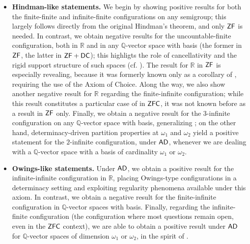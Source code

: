 \documentclass{amsart}
\theoremstyle{definition}
\newcommand{\zf}{\mathnormal{\mathsf{ZF}}}
\newcommand{\dc}{\mathnormal{\mathsf{DC}}}
\newcommand{\ad}{\mathnormal{\mathsf{AD}}}
\newcommand{\zfc}{\mathnormal{\mathsf{ZFC}}}
\theoremstyle{remark}
\numberwithin{equation}{section}
\begin{document}
\begin{itemize}
  \item \textbf{Hindman-like statements.}
  We begin by showing positive results for both the finite-finite and infinite-finite configurations on any semigroup; this largely follows directly from the original Hindman's theorem, and only $\zf$ is needed. In contrast, we obtain negative results for the uncountable-finite configuration, both in $\mathbb R$ and in any $\mathbb Q$-vector space with basis (the former in $\zf$, the latter in $\zf+\dc$); this highligts the role of cancellativity and the rigid support structure of such spaces (cf. \cite{Fernandez2018}). The result for $\mathbb R$ in $\zf$ is especially revealing, because it was formerly known only as a corollary of \cite[Theorem 5]{Fernandez2018}, requiring the use of the Axiom of Choice. Along the way, we also show another negative result for $\mathbb R$ regarding the finite-infinite configuration; while this result constitutes a particular case of \cite[Theorem 12]{FernandezLee2020} in $\zfc$, it was not known before as a result in $\zf$ only. Finally, we obtain a negative result for the $3$-infinite configuration on any $\mathbb Q$-vector space with basis, generalizing \cite[Theorem 5]{FernandezLee2020}; on the other hand, determinacy-driven partition properties at $\omega_1$ and $\omega_2$ yield a positive statement for the $2$-infinite configuration, under $\ad$, whenever we are dealing with a $\mathbb Q$-vector space with a basis of cardinality $\omega_1$ or $\omega_2$.

  \item \textbf{Owings-like statements.}
  Under $\ad$, we obtain a positive result for the infinite-infinite configuration in $\mathbb R$, placing Owings-type configurations in a determinacy setting and exploiting regularity phenomena available under this axiom. In contrast, we obtain a negative result for the finite-infinite configuration in $\mathbb Q$-vector spaces with basis. Finally, regarding the infinite-finite configuration (the configuration where most questions remain open, even in the $\zfc$ context), we are able to obtain a positive result under $\ad$ for $\mathbb{Q}$-vector spaces of dimension $\omega_1$ or $\omega_2$, in the spirit of \cite{LeaderRussell2020}.
\end{itemize}
\end{document}
